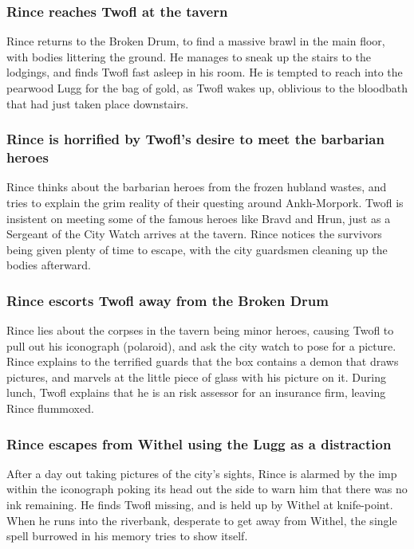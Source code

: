 \subsubsection{\Gls{Rince} reaches \Gls{Twofl} at the tavern}
\Gls{Rince} returns to the Broken Drum, to find a massive brawl in the main floor, with bodies
littering the ground. He manages to sneak up the stairs to the lodgings, and finds \Gls{Twofl}
fast asleep in his room. He is tempted to reach into the pearwood \Gls{Lugg} for the bag of gold,
as \Gls{Twofl} wakes up, oblivious to the bloodbath that had just taken place downstairs.

\subsubsection{\Gls{Rince} is horrified by \Gls{Twofl}'s desire to meet the barbarian heroes}
\Gls{Rince} thinks about the barbarian heroes from the frozen hubland wastes, and tries to explain
the grim reality of their questing around Ankh-Morpork. \Gls{Twofl} is insistent on meeting some of
the famous heroes like \Gls{Bravd} and \Gls{Hrun}, just as a Sergeant of the City Watch arrives at
the tavern. \Gls{Rince} notices the survivors being given plenty of time to escape, with the city
guardsmen cleaning up the bodies afterward.

\subsubsection{\Gls{Rince} escorts \Gls{Twofl} away from the Broken Drum}
\Gls{Rince} lies about the corpses in the tavern being minor heroes, causing \Gls{Twofl} to pull out
his iconograph (polaroid), and ask the city watch to pose for a picture. \Gls{Rince} explains to the
terrified guards that the box contains a demon that draws pictures, and marvels at the little piece
of glass with his picture on it. During lunch, \Gls{Twofl} explains that he is an risk assessor for
an insurance firm, leaving \Gls{Rince} flummoxed.

\subsubsection{\Gls{Rince} escapes from \Gls{Withel} using the \Gls{Lugg} as a distraction}
After a day out taking pictures of the city's sights, \Gls{Rince} is alarmed by the imp within
the iconograph poking its head out the side to warn him that there was no ink remaining. He finds
\Gls{Twofl} missing, and is held up by \Gls{Withel} at knife-point. When he runs into the riverbank,
desperate to get away from \Gls{Withel}, the single spell burrowed in his memory tries to show
itself.

